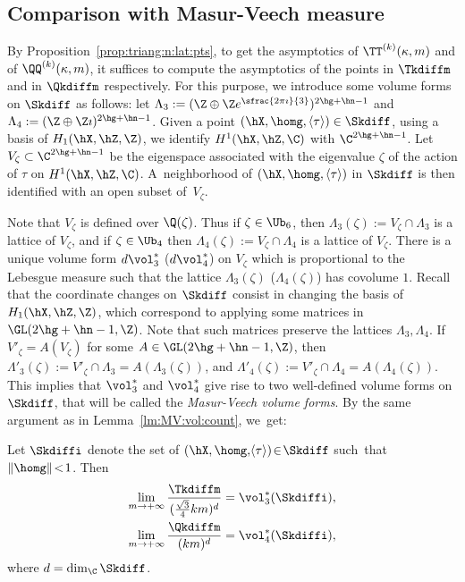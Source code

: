 \subsection{Comparison with Masur-Veech measure}\label{sec:compare:MV:vol}
By Proposition~\ref{prop:triang:n:lat:pts}, to get the asymptotics of $\TT^{(k)}(\kappa,m)$ and of $\QQ^{(k)}(\kappa,m)$, it suffices to compute the asymptotics of the points in $\Tkdiffm$ and in $\Qkdiffm$ respectively. For this purpose, we introduce some volume forms on $\Skdiff$ as follows: let $\Lambda_3:=(\Z\oplus\Z e^{\sfrac{2\pi\imath}{3}})^{2\hg+\hn-1}$ and $\Lambda_4:=(\Z\oplus\Z\imath)^{2\hg+\hn-1}$.
Given a point $(\hX,\homg,\langle\tau\rangle) \in \Skdiff$, using a basis of $H_1(\hX,\hZ,\Z)$, we identify $H^1(\hX,\hZ,\C)$ with $\C^{2\hg+\hn-1}$.
Let $V_\zeta \subset \C^{2\hg+\hn-1}$ be the eigenspace associated with the eigenvalue $\zeta$ of the action of $\tau$ on $H^1(\hX,\hZ,\C)$.
A~neighborhood of $(\hX,\homg,\langle\tau\rangle)$ in $\Skdiff$ is then identified with an open subset of~$V_\zeta$.

Note that $V_\zeta$ is defined over $\Q(\zeta)$. Thus if $\zeta \in \Ub_6$, then $\Lambda_3(\zeta):=V_\zeta\cap\Lambda_3$ is a lattice of $V_\zeta$, and if $\zeta\in \Ub_4$ then $\Lambda_4(\zeta):=V_\zeta\cap\Lambda_4$ is a lattice of $V_\zeta$.
There is a unique volume form $d\vol_3^*$ (\resp $d\vol_4^*$) on $V_\zeta$ which is proportional to the Lebesgue measure such that the lattice $\Lambda_3(\zeta)$ (\resp $\Lambda_4(\zeta)$) has covolume $1$.
Recall that the coordinate changes on $\Skdiff$ consist in changing the basis of $H_1(\hX,\hZ,\Z)$, which correspond to applying some matrices in $\GL(2\hg+\hn-1,\Z)$. Note that such matrices preserve the lattices $\Lambda_3,\Lambda_4$. If $V'_\zeta=A(V_\zeta)$ for some $A\in \GL(2\hg+\hn-1,\Z)$, then $\Lambda'_3(\zeta):=V'_\zeta\cap\Lambda_3=A(\Lambda_3(\zeta))$, and $\Lambda'_4(\zeta):=V'_\zeta\cap\Lambda_4=A(\Lambda_4(\zeta))$.
This implies that $\vol_3^*$ and $\vol_4^*$ give rise to two well-defined volume forms on $\Skdiff$, that will be called the \emph{Masur-Veech volume forms}. By the same argument as in Lemma~\ref{lm:MV:vol:count}, we~get:
\begin{Lemma}\label{lm:MV:asymp:triang} Let $\Skdiffi$ denote the set of $(\hX,\homg,\!\langle\tau\rangle)\!\in\!\Skdiff$ such~that~\hbox{$\|\homg\| \!<\!1$}. Then
\begin{align}
\label{eqn:asymp:n:vol:tria} \lim_{m\to +\infty}\frac{\Tkdiffm}{(\frac{\sqrt{3}}{4}km)^d} & = \vol_3^*(\Skdiffi), \\
\label{eq:asymp:n:vol:quad} \lim_{m\to +\infty}\frac{\Qkdiffm}{(km)^d} & = \vol_4^*(\Skdiffi),
\end{align}
where $d=\dim_\C\Skdiff$.
\end{Lemma}

